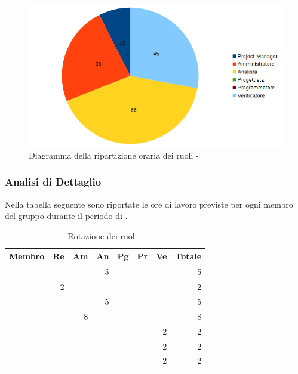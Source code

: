 \documentclass[12pt,a4paper]{article}
\begin{document}
\begin{center}
	\begin{figure}[H]
		\centering
		\includegraphics[width=\textwidth]{../img/diagrammaTortaAnalisiTotaleOre.png}
		\caption{Diagramma della ripartizione oraria dei ruoli - \FA{}}
	\end{figure}
\end{center}

\newpage
\subsubsection{Analisi di Dettaglio}

Nella tabella seguente sono riportate le ore di lavoro previste per ogni membro del gruppo durante il periodo di \FAD{}.

\begin{table}[H]
	\begin{center}
		\begin{tabular}{l r r r r r r r}
			\toprule
			\textbf{Membro}	&	\textbf{Re}	&	\textbf{Am}	& \textbf{An} & \textbf{Pg} & \textbf{Pr} & \textbf{Ve} & \textbf{Totale}\\
			\midrule
			\midrule
			\IB{} & & & 5 & & & & 5 \\
			\midrule
			\AB{} & 2 & & & & & & 2 \\
			\midrule
			\NDC{} & & & 5 & & & & 5 \\
			\midrule
			\TP{} & & 8 & & & & & 8 \\
			\midrule
			\WS{} & & & & & & 2 & 2 \\
			\midrule
			\AVE{} & & & & & & 2 & 2 \\
			\midrule
			\AVI{} & & & & & & 2 & 2 \\
			\bottomrule
		\end{tabular}
		\caption{Rotazione dei ruoli - \FAD{}}
	\end{center}
\end{table}
\end{document}
